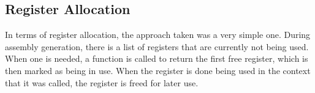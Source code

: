 \documentclass{scrartcl}
\begin{document}
\subsection{Register Allocation}
In terms of register allocation, the approach taken was a very simple one. During assembly generation, there is a list of registers that are currently not being used. When one is needed, a function is called to return the first free register, which is then marked as being in use. When the register is done being used in the context that it was called, the register is freed for later use.
\end{document}
